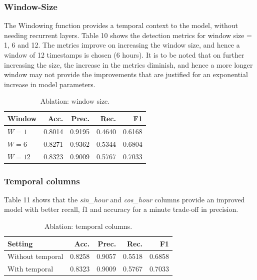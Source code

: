 \documentclass[final,5p,times,twocolumn,authoryear]{elsarticle}
\begin{document}
\subsubsection*{\textbf{Window-Size}}

The Windowing function provides a temporal context to the model, without needing recurrent layers. Table 10 shows the detection metrics for window size = 1, 6 and 12. The metrics improve on increasing the window size, and hence a window of 12 timestamps is chosen (6 hours). It is to be noted that on further increasing the size, the increase in the metrics diminish, and hence a more longer window may not provide the improvements that are justified for an exponential increase in model parameters.

\begin{table}[H]
\centering
\caption{Ablation: window size.}
\label{tab:abl_window}
\small
\begin{tabular}{@{}lrrrr@{}}
\toprule
\textbf{Window} & \textbf{Acc.} & \textbf{Prec.} & \textbf{Rec.} & \textbf{F1} \\ \midrule
$W=1$  & 0.8014 & 0.9195 & 0.4640 & 0.6168 \\
$W=6$  & 0.8271 & 0.9362 & 0.5344 & 0.6804 \\
$W=12$ & 0.8323 & 0.9009 & 0.5767 & 0.7033 \\ 
\bottomrule
\end{tabular}
\end{table}

\subsubsection*{\textbf{Temporal columns}}

Table 11 shows that the \textit{sin\_hour} and \textit{cos\_hour} columns provide an improved model with better recall, f1 and accuracy for a minute trade-off in precision.

\begin{table}[H]
\centering
\caption{Ablation: temporal columns.}
\label{tab:abl_temporal}
\small
\begin{tabular}{@{}lrrrr@{}}
\toprule
\textbf{Setting} & \textbf{Acc.} & \textbf{Prec.} & \textbf{Rec.} & \textbf{F1} \\ \midrule
Without temporal & 0.8258 & 0.9057 & 0.5518 & 0.6858 \\
With temporal    & 0.8323 & 0.9009 & 0.5767 & 0.7033 \\ 
\bottomrule
\end{tabular}
\end{table}
\end{document}
